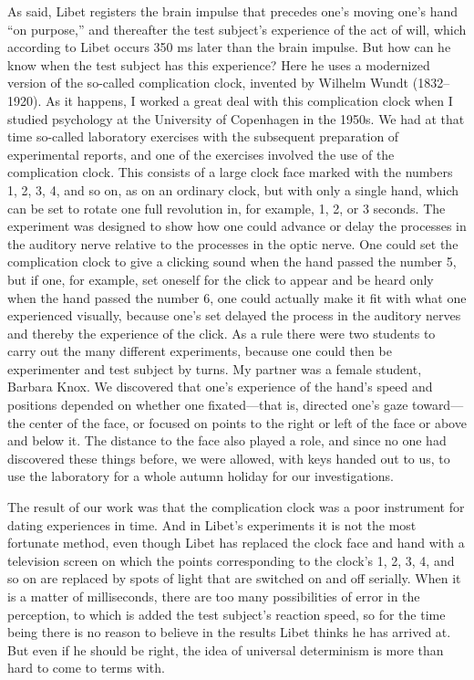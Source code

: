 \documentclass[12pt,a4paper]{book}
\begin{document}
As said, Libet registers the brain impulse that precedes one's moving one's hand ``on purpose,'' and thereafter the test subject's experience of the act of will, which according to Libet occurs 350 ms later than the brain impulse. But how can he know when the test subject has this experience? Here he uses a modernized version of the so-called complication clock, invented by Wilhelm Wundt (1832--1920). As it happens, I worked a great deal with this complication clock when I studied psychology at the University of Copenhagen in the 1950s. We had at that time so-called laboratory exercises with the subsequent preparation of experimental reports, and one of the exercises involved the use of the complication clock. This consists of a large clock face marked with the numbers 1, 2, 3, 4, and so on, as on an ordinary clock, but with only a single hand, which can be set to rotate one full revolution in, for example, 1, 2, or 3 seconds. The experiment was designed to show how one could advance or delay the processes in the auditory nerve relative to the processes in the optic nerve. One could set the complication clock to give a clicking sound when the hand passed the number 5, but if one, for example, set oneself for the click to appear and be heard only when the hand passed the number 6, one could actually make it fit with what one experienced visually, because one's set delayed the process in the auditory nerves and thereby the experience of the click. As a rule there were two students to carry out the many different experiments, because one could then be experimenter and test subject by turns. My partner was a female student, Barbara Knox. We discovered that one's experience of the hand's speed and positions depended on whether one fixated---that is, directed one's gaze toward---the center of the face, or focused on points to the right or left of the face or above and below it. The distance to the face also played a role, and since no one had discovered these things before, we were allowed, with keys handed out to us, to use the laboratory for a whole autumn holiday for our investigations.

The result of our work was that the complication clock was a poor instrument for dating experiences in time. And in Libet's experiments it is not the most fortunate method, even though Libet has replaced the clock face and hand with a television screen on which the points corresponding to the clock's 1, 2, 3, 4, and so on are replaced by spots of light that are switched on and off serially. When it is a matter of milliseconds, there are too many possibilities of error in the perception, to which is added the test subject's reaction speed, so for the time being there is no reason to believe in the results Libet thinks he has arrived at. But even if he should be right, the idea of universal determinism is more than hard to come to terms with.
\end{document}
